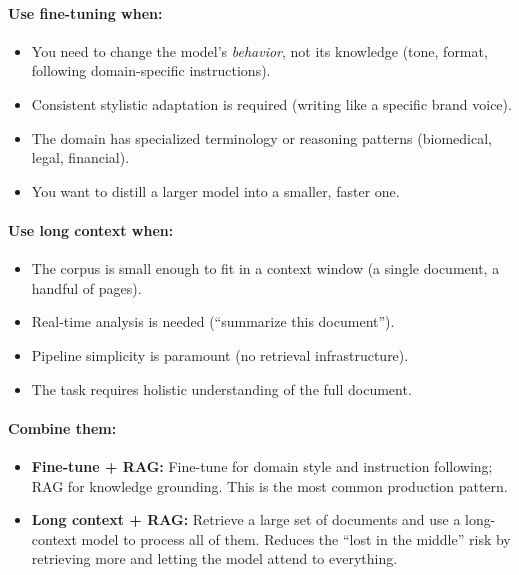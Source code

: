 \paragraph{Use fine-tuning when:}
\begin{itemize}
    \item You need to change the model's \emph{behavior}, not its knowledge
          (tone, format, following domain-specific instructions).
    \item Consistent stylistic adaptation is required (writing like a specific
          brand voice).
    \item The domain has specialized terminology or reasoning patterns
          (biomedical, legal, financial).
    \item You want to distill a larger model into a smaller, faster one.
\end{itemize}

\paragraph{Use long context when:}
\begin{itemize}
    \item The corpus is small enough to fit in a context window (a single
          document, a handful of pages).
    \item Real-time analysis is needed (``summarize this document'').
    \item Pipeline simplicity is paramount (no retrieval infrastructure).
    \item The task requires holistic understanding of the full document.
\end{itemize}

\paragraph{Combine them:}
\begin{itemize}
    \item \textbf{Fine-tune + RAG:} Fine-tune for domain style and instruction
          following; RAG for knowledge grounding.  This is the most common
          production pattern.
    \item \textbf{Long context + RAG:} Retrieve a large set of documents and
          use a long-context model to process all of them.  Reduces the
          ``lost in the middle'' risk by retrieving more and letting the model
          attend to everything.
\end{itemize}

